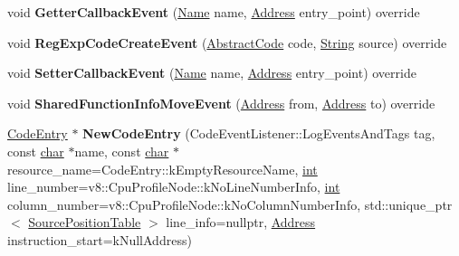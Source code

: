 \begin{DoxyCompactItemize}
\item 
\mbox{\label{classv8_1_1internal_1_1ProfilerListener_ab82cec107fffbc649f80e0dff64fadc7}} 
void {\bfseries Getter\+Callback\+Event} (\mbox{\hyperlink{classv8_1_1internal_1_1Name}{Name}} name, \mbox{\hyperlink{classuintptr__t}{Address}} entry\+\_\+point) override
\item 
\mbox{\label{classv8_1_1internal_1_1ProfilerListener_a299b4b8be8b7e17fe0909f20cbf318e6}} 
void {\bfseries Reg\+Exp\+Code\+Create\+Event} (\mbox{\hyperlink{classv8_1_1internal_1_1AbstractCode}{Abstract\+Code}} code, \mbox{\hyperlink{classv8_1_1internal_1_1String}{String}} source) override
\item 
\mbox{\label{classv8_1_1internal_1_1ProfilerListener_a865b334b5bd03d090fbb66a221b1aa06}} 
void {\bfseries Setter\+Callback\+Event} (\mbox{\hyperlink{classv8_1_1internal_1_1Name}{Name}} name, \mbox{\hyperlink{classuintptr__t}{Address}} entry\+\_\+point) override
\item 
\mbox{\label{classv8_1_1internal_1_1ProfilerListener_ac918ffd305af15e09b273d309de2b2a0}} 
void {\bfseries Shared\+Function\+Info\+Move\+Event} (\mbox{\hyperlink{classuintptr__t}{Address}} from, \mbox{\hyperlink{classuintptr__t}{Address}} to) override
\item 
\mbox{\label{classv8_1_1internal_1_1ProfilerListener_a5e9fe54059f9d141ba7c88a68264a393}} 
\mbox{\hyperlink{classv8_1_1internal_1_1CodeEntry}{Code\+Entry}} $\ast$ {\bfseries New\+Code\+Entry} (Code\+Event\+Listener\+::\+Log\+Events\+And\+Tags tag, const \mbox{\hyperlink{classchar}{char}} $\ast$name, const \mbox{\hyperlink{classchar}{char}} $\ast$resource\+\_\+name=Code\+Entry\+::k\+Empty\+Resource\+Name, \mbox{\hyperlink{classint}{int}} line\+\_\+number=v8\+::\+Cpu\+Profile\+Node\+::k\+No\+Line\+Number\+Info, \mbox{\hyperlink{classint}{int}} column\+\_\+number=v8\+::\+Cpu\+Profile\+Node\+::k\+No\+Column\+Number\+Info, std\+::unique\+\_\+ptr$<$ \mbox{\hyperlink{classv8_1_1internal_1_1SourcePositionTable}{Source\+Position\+Table}} $>$ line\+\_\+info=nullptr, \mbox{\hyperlink{classuintptr__t}{Address}} instruction\+\_\+start=k\+Null\+Address)
\item 

\end{DoxyCompactItemize}
